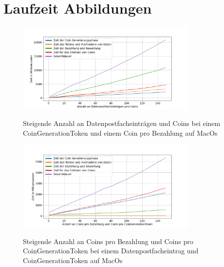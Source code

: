 \documentclass[
	fontsize=11pt,
	headings=small,
	parskip=half,           %
	bibliography=totoc,
	numbers=noenddot,       %
	open=any,               %
]{scrreprt}
\begin{document}
\chapter{Laufzeit Abbildungen}
\begin{figure}[H]
    \caption{Steigende Anzahl an Datenpostfacheinträgen und Coins bei einem CoinGenerationToken und einem Coin pro Bezahlung auf MacOs}
    \centering
    \includegraphics[width=0.8\textwidth]{figure_mac_3.png}
    \label{fig:mac_3}
\end{figure}
\begin{figure}[H]
    \caption{Steigende Anzahl an Coins pro Bezahlung und Coins pro CoinGenerationToken bei einem Datenpostfacheintrag und CoinGenerationToken auf MacOs}
    \centering
    \includegraphics[width=0.8\textwidth]{figure_mac_4.png}
    \label{fig:mac_4}
\end{figure}
\end{document}
